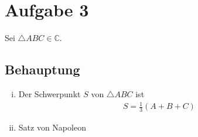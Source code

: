 \documentclass[11pt]{article}
\begin{document}
\section*{Aufgabe 3}
Sei $ \triangle ABC \in \mathbb{C} $.
\subsection*{Behauptung}
\begin{enumerate}[i)]
	\item Der Schwerpunkt $ S $ von $ \triangle ABC $ ist
	\begin{equation*}
	\begin{aligned}
	S = \frac{1}{3} \left(A + B + C\right)
	\end{aligned}
	\end{equation*}
	\item Satz von Napoleon
\end{enumerate}
\end{document}
